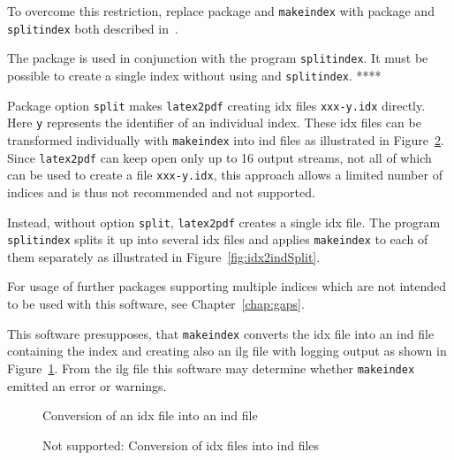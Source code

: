 To overcome this restriction, 
replace package  and \texttt{makeindex} 
with package  and \texttt{splitindex} 
both described in~\cite{SplitidxP}. 

The package  is used 
in conjunction with the program \texttt{splitindex}. 
It must be possible to create a single index 
without using  and \texttt{splitindex}. **** 

Package option \texttt{split} makes \texttt{latex2pdf} 
creating \gls{idx} files \texttt{xxx-y.idx} directly. 
Here \texttt{y} represents the identifier of an individual index. 
These \gls{idx} files can be transformed individually with \texttt{makeindex} 
into ind files as illustrated in Figure~\ref{fig:idx2indMult}. 
Since \texttt{latex2pdf} can keep open only up to 16 output streams, 
not all of which can be used to create a file \texttt{xxx-y.idx}, 
this approach allows a limited number of indices 
and is thus not recommended and not supported. 

Instead, without option \texttt{split}, 
\texttt{latex2pdf} creates a single \gls{idx} file. 
The program \texttt{splitindex} splits it up into several \gls{idx} files 
and applies \texttt{makeindex} to each of them separately 
as illustrated in Figure~\ref{fig:idx2indSplit}. 

For usage of further packages supporting multiple indices 
which are not intended to be used with this software, 
see Chapter~\ref{chap:gaps}. 

This software presupposes, that \texttt{makeindex} converts the \gls{idx} file 
into an ind file containing the index 
and creating also an ilg file with logging output 
as shown in Figure~\ref{fig:idx2ind}. 
From the ilg file this software may determine 
whether \texttt{makeindex} emitted an error or warnings. 

\begin{figure}[htb]
\centering
{}
\caption{\label{fig:idx2ind}Conversion of an \gls{idx} file into an ind file}
\end{figure}

\begin{figure}[htb]
\centering
{}
\caption{\label{fig:idx2indMult}
Not supported: Conversion of \gls{idx} files into ind files}
\end{figure}

